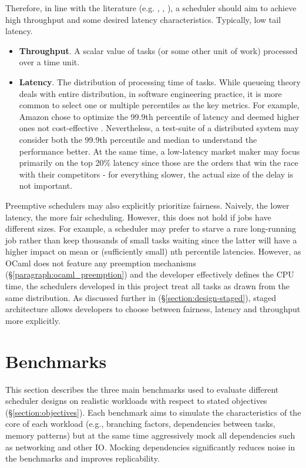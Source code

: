 \documentclass[12pt,a4paper,twoside]{report}
\begin{document}
Therefore, in line with the literature (e.g. \cite{8057206}, \cite{latthrough}, \cite{Sun2021}), a scheduler should aim to achieve high throughput and some desired latency characteristics. Typically, low tail latency.
\begin{itemize}
    \item \textbf{Throughput}. A scalar value of tasks (or some other unit of work) processed over a time unit.
    \item \textbf{Latency}. The distribution of processing time of tasks. While queueing theory deals with entire distribution, in software engineering practice, it is more common to select one or multiple percentiles as the key metrics. For example, Amazon chose to optimize the 99.9th percentile of latency and deemed higher ones not cost-effective \cite{Kleppmann2017-en}. Nevertheless, a test-suite of a distributed system may consider both the 99.9th percentile and median to understand the performance better. At the same time, a low-latency market maker may focus primarily on the top 20\% latency since those are the orders that win the race with their competitors - for everything slower, the actual size of the delay is not important. 
\end{itemize}

Preemptive schedulers may also explicitly prioritize fairness. Naively, the lower latency, the more fair scheduling. However, this does not hold if jobs have different sizes. For example, a scheduler may prefer to starve a rare long-running job rather than keep thousands of small tasks waiting since the latter will have a higher impact on mean or (sufficiently small) nth percentile latencies. However, as OCaml does not feature any preemption mechanisms (\S\ref{paragraph:ocaml_preemption}) and the developer effectively defines the CPU time, the schedulers developed in this project treat all tasks as drawn from the same distribution. As discussed further in (\S\ref{section:design-staged}), staged architecture allows developers to choose between fairness, latency and throughput more explicitly. 


\section{Benchmarks}
This section describes the three main benchmarks used to evaluate different scheduler designs on realistic workloads with respect to stated objectives (\S\ref{section:objectives}). Each benchmark aims to simulate the characteristics of the core of each workload (e.g., branching factors, dependencies between tasks, memory patterns) but at the same time aggressively mock all dependencies such as networking and other IO. Mocking dependencies significantly reduces noise in the benchmarks and improves replicability. 
\end{document}
